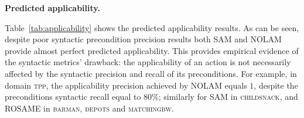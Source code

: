\documentclass[letterpaper]{article} %
\newcommand{\nolam}{NOLAM\xspace}
\newcommand{\rosame}{ROSAME\xspace}
\newcommand{\samshort}{SAM\xspace}
\newcommand{\miniparagraph}[1]{\textbf{#1.}}
\newif\ifaddcomments
\newcommand{\roni}[1]{\ifaddcomments{\textcolor{red}{[Roni: #1]}}\fi}
\newcommand{\leo}[1]{\ifaddcomments{\textcolor{pink}{[Leonardo: #1]}}\fi}
\begin{document}
\miniparagraph{Predicted applicability} 
%

%
Table~\ref{tab:applicability} shows the predicted applicability results. As can be seen, despite poor syntactic precondition precision results both \samshort and \nolam provide almost perfect predicted applicability. This provides empirical evidence of the syntactic metrics' drawback: the applicability of an action is not necessarily affected by the syntactic precision and recall of its preconditions. For example, in domain \textsc{tpp}, the applicability precision achieved by \nolam equals $1$, despite the preconditions syntactic recall equal to $80\%$; similarly for \samshort in \textsc{childsnack}, and \rosame in \textsc{barman}, \textsc{depots} and \textsc{matchingbw}. 


\end{document}

